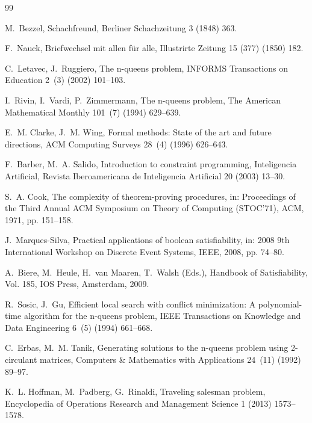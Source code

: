 \documentclass[a4paper,fleqn]{cas-sc}
\begin{document}
\begin{thebibliography}{99}
\small
\setlength{\itemsep}{1.5pt}
\setlength{\parskip}{0pt}

M.~Bezzel, Schachfreund, Berliner Schachzeitung 3 (1848) 363.

F.~Nauck, Briefwechsel mit allen f{\"u}r alle, Illustrirte Zeitung 15 (377) (1850) 182.

C.~Letavec, J.~Ruggiero, The n-queens problem, INFORMS Transactions on Education 2~(3) (2002) 101--103.

I.~Rivin, I.~Vardi, P.~Zimmermann, The n-queens problem, The American Mathematical Monthly 101~(7) (1994) 629--639.

E.~M. Clarke, J.~M. Wing, Formal methods: State of the art and future directions, ACM Computing Surveys 28~(4) (1996) 626--643.

F.~Barber, M.~A. Salido, Introduction to constraint programming, Inteligencia Artificial, Revista Iberoamericana de Inteligencia Artificial 20 (2003) 13--30.

S.~A. Cook, The complexity of theorem-proving procedures, in: Proceedings of the Third Annual ACM Symposium on Theory of Computing (STOC'71), ACM, 1971, pp. 151--158.

J.~Marques-Silva, Practical applications of boolean satisfiability, in: 2008 9th International Workshop on Discrete Event Systems, IEEE, 2008, pp. 74--80.

A.~Biere, M.~Heule, H.~van Maaren, T.~Walsh (Eds.), Handbook of Satisfiability, Vol. 185, IOS Press, Amsterdam, 2009.

R.~Sosic, J.~Gu, Efficient local search with conflict minimization: A polynomial-time algorithm for the n-queens problem, IEEE Transactions on Knowledge and Data Engineering 6~(5) (1994) 661--668.

C.~Erbas, M.~M. Tanik, Generating solutions to the n-queens problem using 2-circulant matrices, Computers \& Mathematics with Applications 24~(11) (1992) 89--97.

K.~L. Hoffman, M.~Padberg, G.~Rinaldi, Traveling salesman problem, Encyclopedia of Operations Research and Management Science 1 (2013) 1573--1578.


\end{thebibliography}
\end{document}
